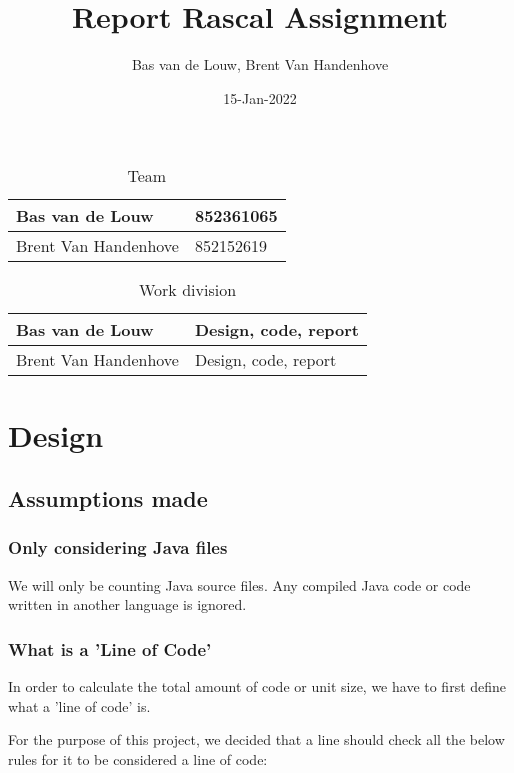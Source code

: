 \documentclass{article}
\title{Report Rascal Assignment}
\author{Bas van de Louw, Brent Van Handenhove}
\date{15-Jan-2022}
\begin{document}
\maketitle

\begin{table}[h!tbp]
	\caption{Team}
	\begin{tabular}{l|l}
		\hline
		Bas van de Louw      & 852361065 \\
		\hline
		Brent Van Handenhove & 852152619 \\
		\hline
	\end{tabular}
\end{table}

\begin{table}[h!tbp]
	\caption{Work division}
	\begin{tabular}{l|l}
		\hline
		Bas van de Louw      & Design, code, report \\
		\hline
		Brent Van Handenhove & Design, code, report \\
		\hline
	\end{tabular}
\end{table}

\hrulefill{}

\vfill
\clearpage

\tableofcontents
\vfill
\clearpage

\section{Design}

\subsection{Assumptions made}

\subsubsection{Only considering Java files}
We will only be counting Java source files. Any compiled Java code or code written in another language is ignored.

\subsubsection{What is a 'Line of Code'} \label{defining loc}
In order to calculate the total amount of code or unit size, we have to first define what a 'line of code' is.

For the purpose of this project, we decided that a line should check all the below rules for it to be considered a line of code:
\end{document}
